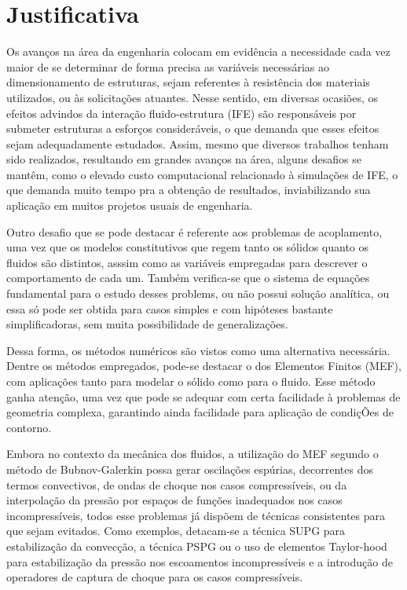 \section{Justificativa}

Os avanços na área da engenharia colocam em evidência a necessidade cada vez maior de se determinar de forma precisa as variáveis necessárias ao dimensionamento de estruturas, sejam referentes à resistência dos materiais utilizados, ou às solicitações atuantes. Nesse sentido, em diversas ocasiões, os efeitos advindos da interação fluido-estrutura (IFE) são responsáveis por submeter estruturas a esforços consideráveis, o que demanda que esses efeitos sejam adequadamente estudados. Assim, mesmo que diversos trabalhos tenham sido realizados, resultando em grandes avanços na área, alguns desafios se mantêm, como o elevado custo computacional relacionado à simulações de IFE, o que demanda muito tempo pra a obtenção de resultados, inviabilizando sua aplicação em muitos projetos usuais de engenharia.

Outro desafio que se pode destacar é referente aos problemas de acoplamento, uma vez que os modelos constitutivos que regem tanto os sólidos quanto os fluidos são distintos, asssim como as variáveis empregadas para descrever o comportamento de cada um. Também verifica-se que o sistema de equações fundamental para o estudo desses problems, ou não possui solução analítica, ou essa só pode ser obtida para casos simples e com hipóteses bastante simplificadoras, sem muita possibilidade de generalizações.

Dessa forma, os métodos numéricos são vistos como uma alternativa necessária. Dentre os métodos empregados, pode-se destacar o dos Elementos Finitos (MEF), com aplicações tanto para modelar o sólido como para o fluido. Esse método ganha atenção, uma vez que pode se adequar com certa facilidade à problemas de geometria complexa, garantindo ainda facilidade para aplicação de condiçÕes de contorno.

Embora no contexto da mecânica dos fluidos, a utilização do MEF segundo o método de Bubnov-Galerkin possa gerar oscilações espúrias, decorrentes dos termos convectivos, de ondas de choque nos casos compressíveis, ou da interpolação da pressão por espaços de funções inadequados nos casos incompressíveis, todos esse problemas já dispõem de técnicas consistentes para que sejam evitados. Como exemplos, detacam-se a técnica SUPG para estabilização da convecção, a técnica PSPG ou o uso de elementos Taylor-hood para estabilização da pressão nos escoamentos incompressíveis e a introdução de operadores de captura de choque para os casos compressíveis.

